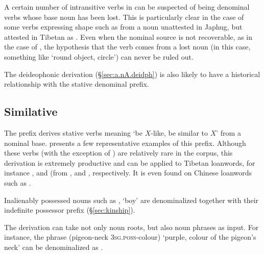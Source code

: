 A certain number of intransitive verbs in  can be suspected of being denominal verbs whose base noun has been lost. This is particularly clear in the case of some verbs expressing shape such as  from a noun  unattested in Japhug, but attested in Tibetan as . Even when the nominal source is not recoverable, as in the case of , the hypothesis that the  verb comes from a lost noun (in this case, something like  `round object, circle') can never be ruled out. 

The deideophonic  derivation (§\ref{sec:a.nA.deidph}) is also likely to have a historical relationship with the stative  denominal prefix.

\subsection{Similative  } \label{sec:denom.arW}
The prefix  derives  stative verbs meaning `be $X$-like, be similar to $X$' from a nominal base.  presents a few representative examples of this prefix. Although these verbs (with the exception of ) are relatively rare in the corpus, this derivation is extremely productive and can be applied to Tibetan loanwords, for instance ,  and  (from ,  and , respectively. It is even found on Chinese loanwords such as .

Inalienably possessed nouns such as , `boy' are denominalized together with their indefinite possessor prefix (§\ref{sec:kinship}).

The  derivation can take not only noun roots, but also noun phrases as input. For instance, the phrase  (pigeon-neck \textsc{3sg}.\textsc{poss}-colour) `purple, colour of the pigeon's neck' can be denominalized as .
 
